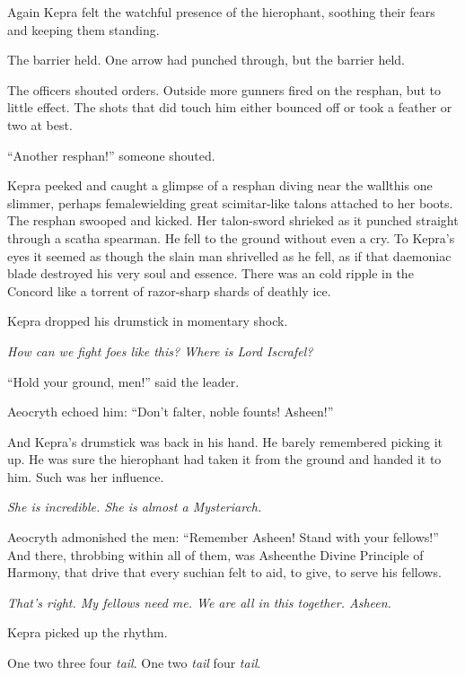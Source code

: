 \documentclass
  [a4paper,
   12pt,
   oneside
  ]%
  {article}
\newcommand{\drum}[1]{\textsf{#1}}
\begin{document}
Again Kepra felt the watchful presence of the hierophant, soothing their fears and keeping them standing.

The barrier held. One arrow had punched through, but the barrier held. 

The officers shouted orders. Outside more gunners fired on the resphan, but to little effect. The shots that did touch him either bounced off or took a feather or two at best.

``Another resphan!'' someone shouted. 

Kepra peeked and caught a glimpse of a resphan diving near the wall\dash{}this one slimmer, perhaps female\dash{}wielding great scimitar-like talons attached to her boots.
The resphan swooped and kicked. Her talon-sword shrieked as it punched straight through a scatha spearman. 
He fell to the ground without even a cry. 
To Kepra’s eyes it seemed as though the slain man shrivelled as he fell, as if that daemoniac blade destroyed his very soul and essence. There was an cold ripple in the Concord like a torrent of razor-sharp shards of deathly ice. 

Kepra dropped his drumstick in momentary shock. 

\emph{How can we fight foes like this? Where is Lord Iscrafel?}

``Hold your ground, men!'' said the leader.

Aeocryth echoed him: ``Don’t falter, noble founts! Asheen!''

And Kepra's drumstick was back in his hand. He barely remembered picking it up. 
He was sure the hierophant had taken it from the ground and handed it to him. Such was her influence. 

\emph{She is incredible. She is almost a Mysteriarch.}

Aeocryth admonished the men: ``Remember Asheen! Stand with your fellows!''
And there, throbbing within all of them, was Asheen\dash{}the Divine Principle of Harmony, that drive that every suchian felt to aid, to give, to serve his fellows.

\emph{That's right. My fellows need me. We are all in this together. Asheen.}

Kepra picked up the rhythm.

\drum{One two three four \emph{tail}. One two \emph{tail} four \emph{tail}.}
\end{document}

